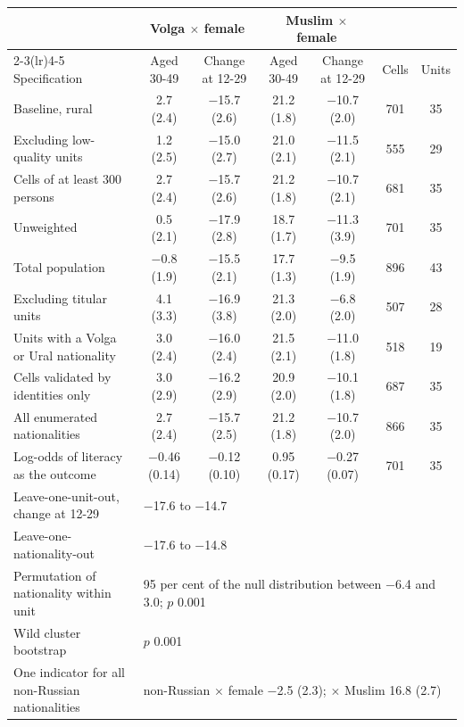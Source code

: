\begin{tabular}{lcccccc}
\toprule
 & \multicolumn{2}{c}{Volga $\times$ female} & \multicolumn{2}{c}{Muslim $\times$ female} & & \\
\cmidrule(lr){2-3}\cmidrule(lr){4-5}
Specification & Aged 30-49 & Change at 12-29 & Aged 30-49 & Change at 12-29 & Cells & Units \\
\midrule
Baseline, rural & 2.7 (2.4) & $-$15.7 (2.6) & 21.2 (1.8) & $-$10.7 (2.0) & 701 & 35 \\
Excluding low-quality units & 1.2 (2.5) & $-$15.0 (2.7) & 21.0 (2.1) & $-$11.5 (2.1) & 555 & 29 \\
Cells of at least 300 persons & 2.7 (2.4) & $-$15.7 (2.6) & 21.2 (1.8) & $-$10.7 (2.1) & 681 & 35 \\
Unweighted & 0.5 (2.1) & $-$17.9 (2.8) & 18.7 (1.7) & $-$11.3 (3.9) & 701 & 35 \\
Total population & $-$0.8 (1.9) & $-$15.5 (2.1) & 17.7 (1.3) & $-$9.5 (1.9) & 896 & 43 \\
Excluding titular units & 4.1 (3.3) & $-$16.9 (3.8) & 21.3 (2.0) & $-$6.8 (2.0) & 507 & 28 \\
Units with a Volga or Ural nationality & 3.0 (2.4) & $-$16.0 (2.4) & 21.5 (2.1) & $-$11.0 (1.8) & 518 & 19 \\
Cells validated by identities only & 3.0 (2.9) & $-$16.2 (2.9) & 20.9 (2.0) & $-$10.1 (1.8) & 687 & 35 \\
All enumerated nationalities & 2.7 (2.4) & $-$15.7 (2.5) & 21.2 (1.8) & $-$10.7 (2.0) & 866 & 35 \\
Log-odds of literacy as the outcome & $-$0.46 (0.14) & $-$0.12 (0.10) & 0.95 (0.17) & $-$0.27 (0.07) & 701 & 35 \\
\midrule
Leave-one-unit-out, change at 12-29 & \multicolumn{6}{l}{$-$17.6 to $-$14.7} \\
Leave-one-nationality-out & \multicolumn{6}{l}{$-$17.6 to $-$14.8} \\
Permutation of nationality within unit & \multicolumn{6}{l}{95 per cent of the null distribution between $-$6.4 and 3.0; $p$ 0.001} \\
Wild cluster bootstrap & \multicolumn{6}{l}{$p$ 0.001} \\
One indicator for all non-Russian nationalities & \multicolumn{6}{l}{non-Russian $\times$ female $-$2.5 (2.3); $\times$ Muslim 16.8 (2.7)} \\
\bottomrule
\end{tabular}
